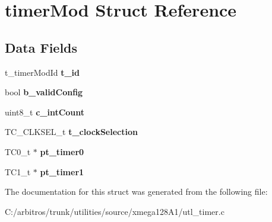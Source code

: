 \hypertarget{structtimer_mod}{\section{timer\-Mod Struct Reference}
\label{structtimer_mod}
}
\subsection*{Data Fields}
\begin{DoxyCompactItemize}
\item 
\hypertarget{structtimer_mod_adfd4e94b328e25c0a6c6b4103f294137}{t\-\_\-timer\-Mod\-Id {\bfseries t\-\_\-id}}\label{structtimer_mod_adfd4e94b328e25c0a6c6b4103f294137}

\item 
\hypertarget{structtimer_mod_a73c33a12d6cfbcd5768be5bddef10c27}{bool {\bfseries b\-\_\-valid\-Config}}\label{structtimer_mod_a73c33a12d6cfbcd5768be5bddef10c27}

\item 
\hypertarget{structtimer_mod_ad8de5a86599bef13c436790dfa6eacd5}{uint8\-\_\-t {\bfseries c\-\_\-int\-Count}}\label{structtimer_mod_ad8de5a86599bef13c436790dfa6eacd5}

\item 
\hypertarget{structtimer_mod_a3a6d233dbb40fc292156962ddb91f45b}{T\-C\-\_\-\-C\-L\-K\-S\-E\-L\-\_\-t {\bfseries t\-\_\-clock\-Selection}}\label{structtimer_mod_a3a6d233dbb40fc292156962ddb91f45b}

\item 
\hypertarget{structtimer_mod_a630e7fa2e109251d3bc27cdd36a2113f}{T\-C0\-\_\-t $\ast$ {\bfseries pt\-\_\-timer0}}\label{structtimer_mod_a630e7fa2e109251d3bc27cdd36a2113f}

\item 
\hypertarget{structtimer_mod_a61052402c7e59dc2d0ccc8b5fb527b6b}{T\-C1\-\_\-t $\ast$ {\bfseries pt\-\_\-timer1}}\label{structtimer_mod_a61052402c7e59dc2d0ccc8b5fb527b6b}

\end{DoxyCompactItemize}


The documentation for this struct was generated from the following file\-:\begin{DoxyCompactItemize}
\item 
C\-:/arbitros/trunk/utilities/source/xmega128\-A1/utl\-\_\-timer.\-c\end{DoxyCompactItemize}
